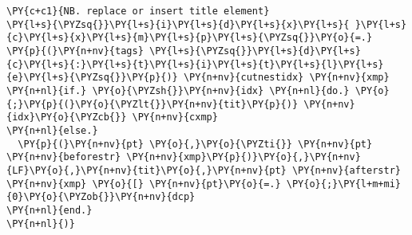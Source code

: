 \begin{tcolorbox}[breakable, size=fbox, boxrule=1pt, pad at break*=1mm,colback=cellbackground, colframe=cellborder]
\begin{Verbatim}[commandchars=\\\{\}]
\PY{c+c1}{NB. replace or insert title element}
\PY{l+s}{\PYZsq{}}\PY{l+s}{i}\PY{l+s}{d}\PY{l+s}{x}\PY{l+s}{ }\PY{l+s}{c}\PY{l+s}{x}\PY{l+s}{m}\PY{l+s}{p}\PY{l+s}{\PYZsq{}}\PY{o}{=.} \PY{p}{(}\PY{n+nv}{tags} \PY{l+s}{\PYZsq{}}\PY{l+s}{d}\PY{l+s}{c}\PY{l+s}{:}\PY{l+s}{t}\PY{l+s}{i}\PY{l+s}{t}\PY{l+s}{l}\PY{l+s}{e}\PY{l+s}{\PYZsq{}}\PY{p}{)} \PY{n+nv}{cutnestidx} \PY{n+nv}{xmp}
\PY{n+nl}{if.} \PY{o}{\PYZsh{}}\PY{n+nv}{idx} \PY{n+nl}{do.} \PY{o}{;}\PY{p}{(}\PY{o}{\PYZlt{}}\PY{n+nv}{tit}\PY{p}{)} \PY{n+nv}{idx}\PY{o}{\PYZcb{}} \PY{n+nv}{cxmp}
\PY{n+nl}{else.}
  \PY{p}{(}\PY{n+nv}{pt} \PY{o}{,}\PY{o}{\PYZti{}} \PY{n+nv}{pt} \PY{n+nv}{beforestr} \PY{n+nv}{xmp}\PY{p}{)}\PY{o}{,}\PY{n+nv}{LF}\PY{o}{,}\PY{n+nv}{tit}\PY{o}{,}\PY{n+nv}{pt} \PY{n+nv}{afterstr} \PY{n+nv}{xmp} \PY{o}{[} \PY{n+nv}{pt}\PY{o}{=.} \PY{o}{;}\PY{l+m+mi}{0}\PY{o}{\PYZob{}}\PY{n+nv}{dcp}
\PY{n+nl}{end.}
\PY{n+nl}{)}
\end{Verbatim}
\end{tcolorbox}



